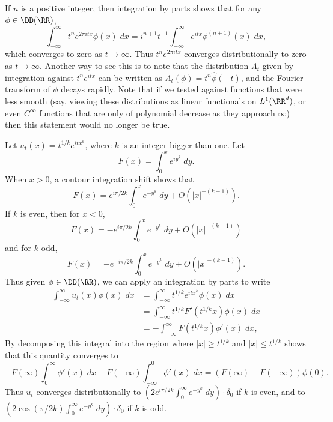 \begin{example}
    If $n$ is a positive integer, then integration by parts shows that for any $\phi \in \DD(\RR)$,
    \[ \int_{-\infty}^\infty t^n e^{2 \pi itx} \phi(x)\; dx = i^{n+1} t^{-1} \int_{-\infty}^\infty e^{itx} \phi^{(n+1)}(x)\; dx, \]
    which converges to zero as $t \to \infty$. Thus $t^n e^{2 \pi itx}$ converges distributionally to zero as $t \to \infty$. Another way to see this is to note that the distribution $\Lambda_t$ given by integration against $t^n e^{itx}$ can be written as $\Lambda_t(\phi) = t^n \widehat{\phi}(-t)$, and the Fourier transform of $\phi$ decays rapidly. Note that if we tested against functions that were less smooth (say, viewing these distributions as linear functionals on $L^1(\RR^d)$, or even $C^\infty$ functions that are only of polynomial decrease as they approach $\infty$) then this statement would no longer be true.
\end{example}

\begin{example}
    Let $u_t(x) = t^{1/k} e^{itx^k}$, where $k$ is an integer bigger than one. Let
    \[ F(x) = \int_0^x e^{iy^k}\; dy. \]
    When $x > 0$, a contour integration shift shows that
    \[ F(x) = e^{i \pi / 2k} \int_0^x e^{-y^k}\; dy + O(|x|^{-(k-1)}). \]
    If $k$ is even, then for $x < 0$,
    \[ F(x) = - e^{i \pi / 2k} \int_0^x e^{-y^k}\; dy + O(|x|^{-(k-1)}) \]
    and for $k$ odd,
    \[ F(x) = - e^{-i \pi / 2k} \int_0^x e^{-y^k}\; dy + O(|x|^{-(k-1)}). \]
    Thus given $\phi \in \DD(\RR)$, we can apply an integration by parts to write
    \begin{align*}
        \int_{-\infty}^\infty u_t(x) \phi(x)\; dx &= \int_{-\infty}^\infty t^{1/k} e^{itx^k} \phi(x)\; dx \\
        &= \int_{-\infty}^\infty t^{1/k} F'(t^{1/k} x) \phi(x)\; dx\\
        &= - \int_{-\infty}^\infty F(t^{1/k} x) \phi'(x)\; dx,
     \end{align*}
     By decomposing this integral into the region where $|x| \geq t^{1/k}$ and $|x| \leq t^{1/k}$ shows that this quantity converges to
     \[ - F(\infty) \int_0^\infty \phi'(x)\; dx - F(-\infty) \int_{-\infty}^0 \phi'(x)\; dx = (F(\infty) - F(-\infty)) \phi(0). \]
     Thus $u_t$ converges distributionally to $\left( 2 e^{i \pi / 2k} \int_0^\infty e^{-y^k}\; dy \right) \cdot \delta_0$ if $k$ is even, and to $\left( 2 \cos(\pi / 2k) \int_0^\infty e^{-y^k}\; dy \right) \cdot \delta_0$ if $k$ is odd.
\end{example}

